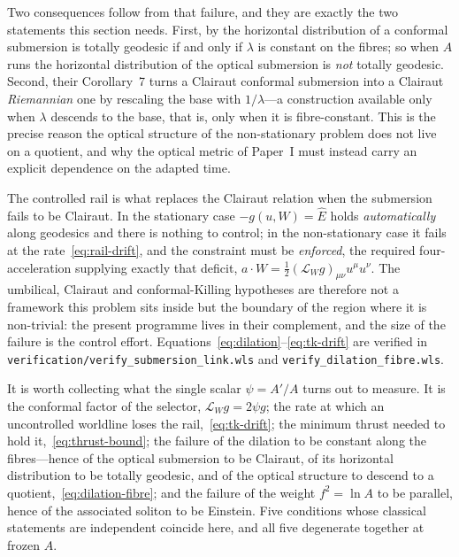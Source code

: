 \documentclass[12pt]{iopart}
\theoremstyle{plain}
\theoremstyle{definition}
\theoremstyle{remark}
\newcommand{\Ehat}{\hat E}
\begin{document}
Two consequences follow from that failure, and they are exactly the two
statements this section needs. First, by \cite[Prop.~1]{MeenaZawadzki2024} the
horizontal distribution of a conformal submersion is totally geodesic if and only
if $\lambda$ is constant on the fibres; so when $A$ runs the horizontal
distribution of the optical submersion is \emph{not} totally geodesic. Second,
their Corollary~7 turns a Clairaut conformal submersion into a Clairaut
\emph{Riemannian} one by rescaling the base with $1/\lambda$---a construction
available only when $\lambda$ descends to the base, that is, only when it is
fibre-constant. This is the precise reason the optical structure of the
non-stationary problem does not live on a quotient, and why the optical metric of
Paper~I must instead carry an explicit dependence on the adapted time.

The controlled rail is what replaces the Clairaut relation when the submersion
fails to be Clairaut. In the stationary case $-g(u,W)=\Ehat$ holds
\emph{automatically} along geodesics and there is nothing to control; in the
non-stationary case it fails at the rate~\eqref{eq:rail-drift}, and the
constraint must be \emph{enforced}, the required four-acceleration supplying
exactly that deficit, $a\cdot W=\tfrac12(\mathcal L_Wg)_{\mu\nu}u^\mu u^\nu$. The
umbilical, Clairaut and conformal-Killing hypotheses are therefore not a
framework this problem sits inside but the boundary of the region where it is
non-trivial: the present programme lives in their complement, and the size of the
failure is the control effort. Equations~\eqref{eq:dilation}--\eqref{eq:tk-drift}
are verified in \texttt{verification/verify\_submersion\_link.wls} and
\texttt{verify\_dilation\_fibre.wls}.

It is worth collecting what the single scalar $\psi=A'/A$ turns out to measure.
It is the conformal factor of the selector, $\mathcal L_Wg=2\psi g$; the rate at
which an uncontrolled worldline loses the rail,~\eqref{eq:tk-drift}; the
minimum thrust needed to hold it,~\eqref{eq:thrust-bound}; the failure of the
dilation to be constant along the fibres---hence of the optical submersion to be
Clairaut, of its horizontal distribution to be totally geodesic, and of the
optical structure to descend to a quotient,~\eqref{eq:dilation-fibre}; and the failure of the weight $f^2=\ln A$ to
be parallel, hence of the associated soliton to be Einstein. Five conditions
whose classical statements are independent coincide here, and all five degenerate
together at frozen $A$.
\end{document}
